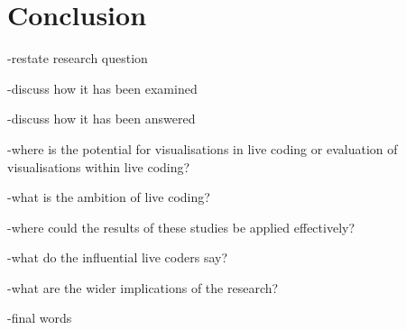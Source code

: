 
\chapter{Conclusion}
\label{chap:conclusion}

-restate research question

-discuss how it has been examined

-discuss how it has been answered

-where is the potential for visualisations in live coding or evaluation of visualisations within live coding?

-what is the ambition of live coding?

-where could the results of these studies be applied effectively?

-what do the influential live coders say?

-what are the wider implications of the research?

-final words


